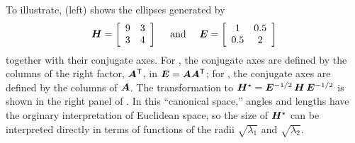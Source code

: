 To illustrate,  (left) shows
the ellipses generated by
\begin{equation*}
 \bm{H} = \left[ \begin{array}{cc}
                   9 & 3 \\
                   3 & 4
                  \end{array}\right]
 \quad \mbox{ and } \quad
 \bm{E} = \left[ \begin{array}{cc}
                   1 & 0.5 \\
                   0.5 & 2
                  \end{array}\right]
\end{equation*}
together with their conjugate axes. For , the conjugate axes are defined by the columns of the right factor,
$\bm{A}^\mathsf{T}$,
in $\bm{E} = \bm{A} \bm{A}^\mathsf{T}$; for , the conjugate axes are defined by the columns of $\bm{A}$.
The transformation to $\bm{H}^\star = \bm{E}^{-1/2} \, \bm{H} \, \bm{E}^{-1/2}$ is shown in the right panel
of . In this ``canonical space,'' angles and lengths have the orginary interpretation
of Euclidean space, so the size of $\bm{H}^\star$ can be interpreted directly in terms of functions of
the radii $\sqrt{\lambda_1}$ and $\sqrt{\lambda_2}$.

